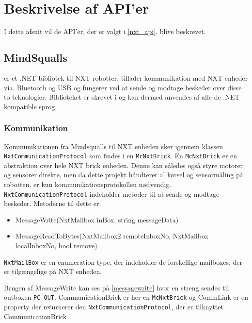 
\section{Beskrivelse af API'er}

I dette afsnit vil de API'er, der er valgt i \cref{nxt_api}, blive beskrevet.

\subsection{MindSqualls}\label{mindsqualls}
\mindsqualls er et .NET bibliotek til \legos NXT robotter.
\mindsqualls tillader kommunikation med NXT enheder via. Bluetooth og USB og fungerer ved at sende og modtage beskeder over disse to teknologier.
Biblioteket er skrevet i \csharp og kan dermed anvendes af alle de .NET kompatible sprog.

\subsubsection{Kommunikation}
Kommunikationen fra Mindsqualls til NXT enheden sker igennem klassen \lstinline!NxtCommunicationProtocol! som findes i en \lstinline!McNxtBrick!. 
En \lstinline!McNxtBrick! er en abstraktion over hele NXT brick enheden. 
Denne kan således også styre motorer og sensorer direkte, men da dette projekt håndterer al kørsel og sensormåling på robotten, er kun kommunikationsprotokollen nødvendig.
\lstinline!NxtCommunicationProtocol! indeholder metoder til at sende og modtage beskeder.
Metoderne til dette er:

\begin{itemize}
\item MessageWrite(NxtMailbox inBox, string messageData)
\item MessageReadToBytes(NxtMailbox2 remoteInboxNo, NxtMailbox localInboxNo, bool remove)
\end{itemize}

\lstinline!NxtMailBox! er en enumeration type, der indeholder de forskellige mailboxes, der er tilgængelige på NXT enheden.

Brugen af MessageWrite kan ses på \cref{messagewrite} hvor en streng sendes til outboxen \lstinline!PC_OUT!.
CommunicationBrick er her en \lstinline!McNxtBrick! og CommLink er en property der returnerer den \lstinline!NxtCommunicationProtocol!, der er tilknyttet CommunicationBrick 

